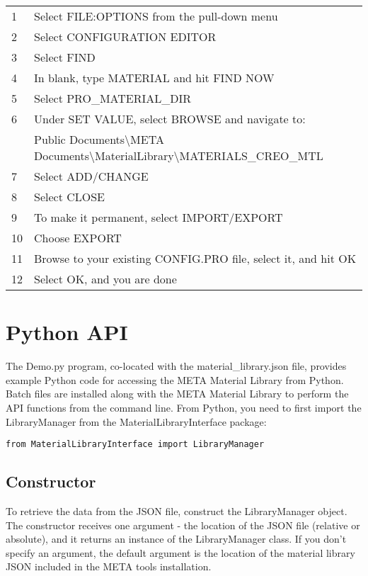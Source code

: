 \documentclass[letter]{article}
\begin{document}
\begin{tabular}{ll}
1 & Select FILE:OPTIONS from the pull-down menu\\
2 & Select CONFIGURATION EDITOR\\
3 & Select FIND\\
4 & In blank, type MATERIAL and hit FIND NOW\\
5 & Select PRO\_MATERIAL\_DIR\\
6 & Under SET VALUE, select BROWSE and navigate to: \\
  & Public Documents\textbackslash META Documents\textbackslash MaterialLibrary\textbackslash MATERIALS\_CREO\_MTL\\
7 & Select ADD/CHANGE\\
8 & Select CLOSE\\
9 & To make it permanent, select IMPORT/EXPORT\\
10 & Choose EXPORT\\
11 & Browse to your existing CONFIG.PRO file, select it, and hit OK\\
12 & Select OK, and you are done\\
\end{tabular}

\section{Python API}
The Demo.py program, co-located with the material\_library.json file, provides example Python code for accessing the META Material Library from Python. Batch files are installed along with the META Material Library to perform the API functions from the command line. From Python, you need to first import the LibraryManager from the MaterialLibraryInterface package:

\begin{lstlisting}
from MaterialLibraryInterface import LibraryManager
\end{lstlisting}

\subsection{Constructor}
 To retrieve the data from the JSON file, construct the LibraryManager object. The constructor receives one argument - the location of the JSON file (relative or absolute), and it returns an instance of the LibraryManager class. If you don't specify an argument, the default argument is the location of the material library JSON included in the META tools installation.
\end{document}
